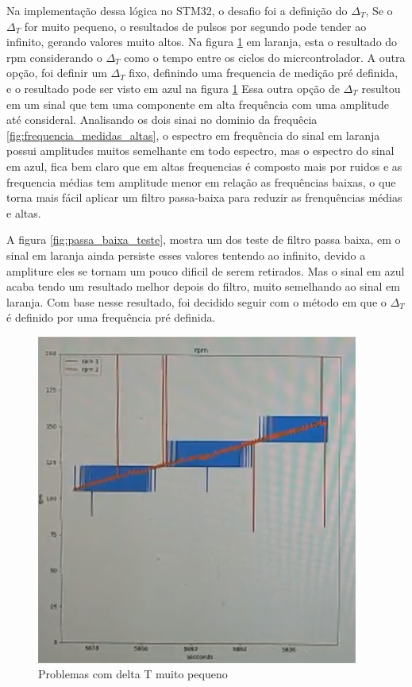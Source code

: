 Na implementação dessa lógica no STM32, o desafio foi a definição do $\Delta_{T}$,
Se o $\Delta_{T}$ for muito pequeno, o resultados de pulsos por segundo pode tender ao infinito, gerando valores muito altos.
Na figura \ref{fig:medidas_altas} em laranja, esta o resultado do rpm considerando o $\Delta_{T}$ como o tempo entre os ciclos do micrcontrolador.
A outra opção, foi definir um $\Delta_{T}$ fixo, definindo uma frequencia de medição pré definida, e o resultado pode ser visto em azul na figura \ref{fig:medidas_altas}
Essa outra opção de $\Delta_{T}$ resultou em um sinal que tem uma componente em alta frequência com uma amplitude até consideral.
Analisando os dois sinai no dominio da frequêcia \ref{fig:frequencia_medidas_altas}, o espectro em frequência do sinal em laranja possui amplitudes muitos semelhante em todo espectro, mas o espectro do sinal em azul, fica bem claro que em altas frequencias é composto mais por ruidos
e as frequencia médias tem amplitude menor em relação as frequências baixas, o que torna mais fácil aplicar um filtro passa-baixa para reduzir as frenquências médias e altas.

A figura \ref{fig:passa_baixa_teste}, mostra um dos teste de filtro passa baixa, em o sinal em laranja ainda persiste esses valores tentendo ao infinito, devido a ampliture eles se tornam um pouco dificil de serem retirados.
Mas o sinal em azul acaba tendo um resultado melhor depois do filtro, muito semelhando ao sinal em laranja.
Com base nesse resultado, foi decidido seguir com o método em que o $\Delta_{T}$ é definido por uma frequência pré definida.


\begin{figure}[h]
    \centering
    \includegraphics{figures/medidas_altas}
    \caption{Problemas com delta T muito pequeno}
    \label{fig:medidas_altas}
\end{figure}

